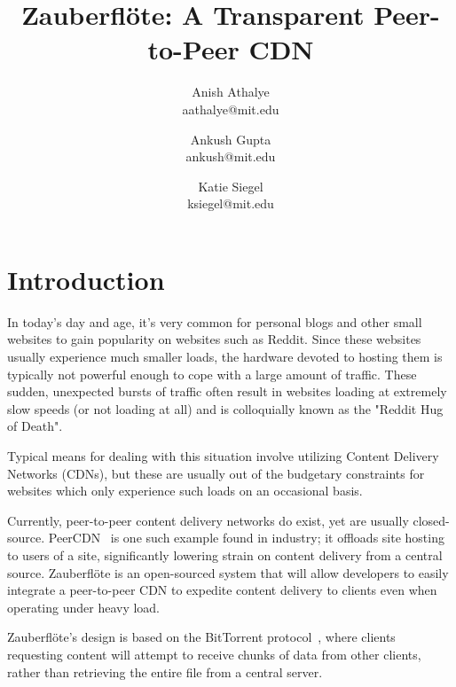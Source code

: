 \documentclass[letterpaper,twocolumn,10pt]{article}
\newcommand{\zbf}{Zauberfl\"{o}te\xspace}
\newcommand{\projtitle}{\zbf: A Transparent Peer-to-Peer CDN}
\begin{document}
\title{\Large \bf \projtitle}

\author{
    {\rm Anish Athalye}\\
    aathalye@mit.edu
    \and
    {\rm Ankush Gupta}\\
    ankush@mit.edu
    \and
    {\rm Katie Siegel}\\
    ksiegel@mit.edu
}

\maketitle
\thispagestyle{empty}

\begin{abstract}
\end{abstract}

\section{Introduction}
In today's day and age, it's very common for personal blogs and other small websites to gain popularity on websites such as Reddit. Since these websites usually experience much smaller loads, the hardware devoted to hosting them is typically not powerful enough to cope with a large amount of traffic. These sudden, unexpected bursts of traffic often result in websites loading at extremely slow speeds (or not loading at all) and is colloquially known as the "Reddit Hug of Death".

Typical means for dealing with this situation involve utilizing Content Delivery Networks (CDNs), but these are usually out of the budgetary constraints for websites which only experience such loads on an occasional basis.

Currently, peer-to-peer content delivery networks do exist, yet are usually
closed-source. PeerCDN~\cite{peercdn} is one such example found in
industry; it offloads site hosting to users of a site, significantly lowering strain on content delivery from a central source. \zbf is an open-sourced system
that will allow developers to easily integrate a peer-to-peer CDN to expedite
content delivery to clients even when operating under heavy load.

\zbf's design is based on the BitTorrent protocol~\cite{cohen:bittorrent}, where
clients requesting content will attempt to receive chunks of data from other
clients, rather than retrieving the entire file from a central server.

\end{document}
